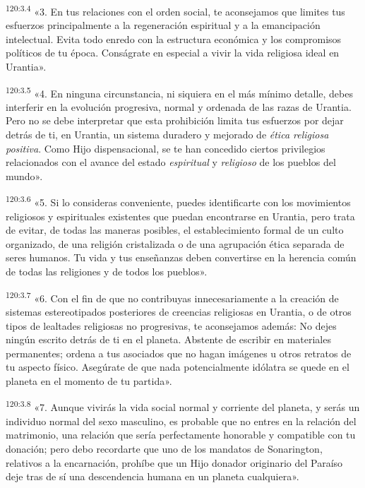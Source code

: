 \par
\textsuperscript{120:3.4} «3. En tus relaciones con el orden social, te aconsejamos que limites tus esfuerzos principalmente a la regeneración espiritual y a la emancipación intelectual. Evita todo enredo con la estructura económica y los compromisos políticos de tu época. Conságrate en especial a vivir la vida religiosa ideal en Urantia».

\par
\textsuperscript{120:3.5} «4. En ninguna circunstancia, ni siquiera en el más mínimo detalle, debes interferir en la evolución progresiva, normal y ordenada de las razas de Urantia. Pero no se debe interpretar que esta prohibición limita tus esfuerzos por dejar detrás de ti, en Urantia, un sistema duradero y mejorado de \textit{ética religiosa positiva}. Como Hijo dispensacional, se te han concedido ciertos privilegios relacionados con el avance del estado \textit{espiritual} y \textit{religioso} de los pueblos del mundo».

\par
\textsuperscript{120:3.6} «5. Si lo consideras conveniente, puedes identificarte con los movimientos religiosos y espirituales existentes que puedan encontrarse en Urantia, pero trata de evitar, de todas las maneras posibles, el establecimiento formal de un culto organizado, de una religión cristalizada o de una agrupación ética separada de seres humanos. Tu vida y tus enseñanzas deben convertirse en la herencia común de todas las religiones y de todos los pueblos».

\par
\textsuperscript{120:3.7} «6. Con el fin de que no contribuyas innecesariamente a la creación de sistemas estereotipados posteriores de creencias religiosas en Urantia, o de otros tipos de lealtades religiosas no progresivas, te aconsejamos además: No dejes ningún escrito detrás de ti en el planeta. Abstente de escribir en materiales permanentes; ordena a tus asociados que no hagan imágenes u otros retratos de tu aspecto físico. Asegúrate de que nada potencialmente idólatra se quede en el planeta en el momento de tu partida».

\par
\textsuperscript{120:3.8} «7. Aunque vivirás la vida social normal y corriente del planeta, y serás un individuo normal del sexo masculino, es probable que no entres en la relación del matrimonio, una relación que sería perfectamente honorable y compatible con tu donación; pero debo recordarte que uno de los mandatos de Sonarington, relativos a la encarnación, prohíbe que un Hijo donador originario del Paraíso deje tras de sí una descendencia humana en un planeta cualquiera».

